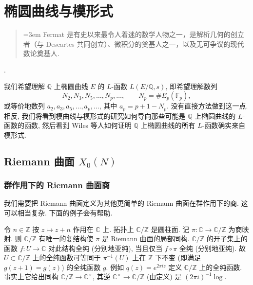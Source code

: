 \chapter{椭圆曲线与模形式}\label{ch:5}

\begin{quote}\small\itshape
{\emergencystretch=3em Fermat 是有史以来最令人着迷的数学人物之一，是解析几何的创立者（与 Descartes 共同创立）、微积分的奠基人之一，以及无可争议的现代数论奠基人.\par}
\end{quote}
\vspace{-0.5em}
\hfill \small \cite{weil1973}.

我们希望理解 $\mathbb{Q}$ 上椭圆曲线 $E$ 的 $L$-函数 $L(E/\mathbb{Q}, s)$, 即希望理解数列
\[
N_2, N_3, N_5, \dots, N_p, \dots, \qquad N_p = \#E_p(\mathbb{F}_p),
\]
或等价地数列 $a_2, a_3, a_5, \dots, a_p, \dots$, 其中 $a_p = p + 1 - N_p$. 没有直接方法做到这一点. 相反, 我们将看到模曲线与模形式的研究如何导向那些可能是 $\mathbb{Q}$ 上椭圆曲线的 $L$-函数的函数, 然后看到 Wiles 等人如何证明 $\mathbb{Q}$ 上椭圆曲线的所有 $L$-函数确实来自模形式.

\section{\texorpdfstring{Riemann 曲面 $X_0(N)$}{Riemann 曲面 X0(N)}}\label{sec:5.1}

\subsection*{群作用下的 Riemann 曲面商}

我们需要把 Riemann 曲面定义为其他更简单的 Riemann 曲面在群作用下的商. 这可以相当复杂. 下面的例子会有帮助.

\begin{example} \label{thm:5.1.1} 
令 $n\in\mathbb{Z}$ 按 $z\mapsto z + n$ 作用在 $\mathbb{C}$ 上. 拓扑上 $\mathbb{C}/\mathbb{Z}$ 是圆柱面. 记 $\pi\colon\mathbb{C}\to\mathbb{C}/\mathbb{Z}$ 为商映射. 则 $\mathbb{C}/\mathbb{Z}$ 有唯一的复结构使 $\pi$ 是 Riemann 曲面的局部同构. $\mathbb{C}/\mathbb{Z}$ 的开子集上的函数 $f\colon U\to\mathbb{C}$ 对此结构全纯 (分别地亚纯), 当且仅当 $f\circ\pi$ 全纯 (分别地亚纯). 故 $U\subset\mathbb{C}/\mathbb{Z}$ 上的全纯函数可等同于 $\pi^{-1}(U)$ 上在 $\mathbb{Z}$ 下不变 (即满足 $g(z+1) = g(z)$) 的全纯函数 $g$. 例如 $q(z) = e^{2\pi iz}$ 定义 $\mathbb{C}/\mathbb{Z}$ 上的全纯函数. 事实上它给出同构 $\mathbb{C}/\mathbb{Z}\to\mathbb{C}^{\times}$, 其逆 $\mathbb{C}^{\times}\to\mathbb{C}/\mathbb{Z}$ (由定义) 是 $(2\pi i)^{-1}\log$.
\end{example}

